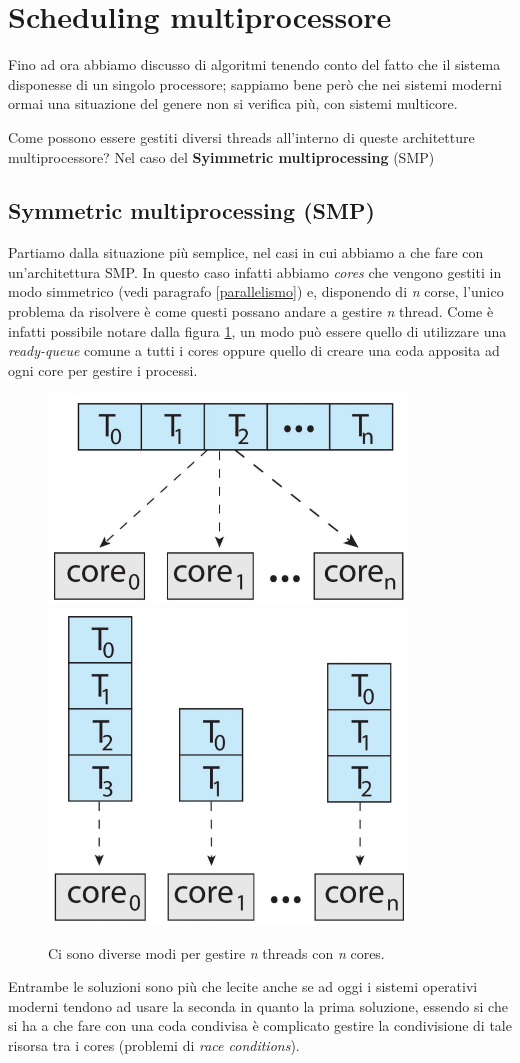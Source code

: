 % 
\section{Scheduling multiprocessore}
Fino ad ora abbiamo discusso di algoritmi tenendo conto del fatto che il sistema disponesse di un singolo processore; sappiamo bene però che nei sistemi moderni ormai una situazione del genere non si verifica più, con sistemi multicore. 

Come possono essere gestiti diversi threads all'interno di queste architetture multiprocessore? Nel caso del \textbf{Syimmetric multiprocessing} (SMP) 

\subsection{Symmetric multiprocessing (SMP)}
Partiamo dalla situazione più semplice, nel casi in cui abbiamo a che fare con un'architettura SMP. In questo caso infatti abbiamo \textit{cores} che vengono gestiti in modo simmetrico (vedi paragrafo \ref{parallelismo}) e, disponendo di \textit{n} corse, l'unico problema da risolvere è come questi possano andare a gestire \textit{n} thread. Come è infatti possibile notare dalla figura \ref{fig:solutionAB}, un modo può essere quello di utilizzare una \textit{ready-queue} comune a tutti i cores oppure quello di creare una coda apposita ad ogni core per gestire i processi. 
\begin{figure}[h]
    \centering
    \includegraphics[width = .25\textwidth]{../res/imgs/CPU scheduling/solution_A.png}
    \hspace{2em}
    \includegraphics[width = .25\textwidth]{../res/imgs/CPU scheduling/solution_B.png}
    \caption{Ci sono diverse modi per gestire \textit{n} threads con \textit{n} cores.}
    \label{fig:solutionAB}
\end{figure}
Entrambe le soluzioni sono più che lecite anche se ad oggi i sistemi operativi moderni tendono ad usare la seconda in quanto la prima soluzione, essendo si che si ha a che fare con una coda condivisa è complicato gestire la condivisione di tale risorsa tra i cores (problemi di \textit{race conditions}).

